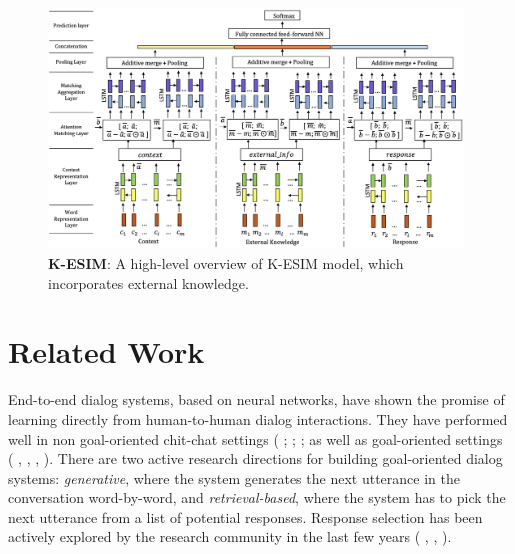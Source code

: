 \documentclass[letterpaper]{article} %
\begin{document}
\begin{figure}[h]
\centering
\includegraphics[width=0.98\textwidth]{images/esim_manpages_v3_new_2.png}
\caption{\textbf{K-ESIM}: A high-level overview of K-ESIM model, which incorporates external knowledge.}
\label{fig_k_esim}
\end{figure}

\section{Related Work}
\label{related-work}
End-to-end dialog systems, based on neural networks, have shown the promise of learning directly from human-to-human dialog interactions. They have performed well in non goal-oriented chit-chat settings (
\citeauthor{vinyals2015neural} ; \citeauthor{sordoni2015neural} ; \citeauthor{serban2016building} ;
as well as goal-oriented settings (\citeauthor{le2016lstm} , \citeauthor{ghazvininejad2017knowledge} ,  \citeauthor{bordes2016learning} , \citeauthor{seo2016query} ). There are two active research directions for building goal-oriented dialog systems: \textit{generative}, where the system generates the next utterance in the conversation word-by-word, and \textit{retrieval-based}, where the system has to pick the next utterance from a list of potential responses. Response selection has been actively explored by the research community in the last few years (\citeauthor{dong2018enhance} , \citeauthor{wu2016sequential} , \citeauthor{bartl2017retrieval} ).
\end{document}
